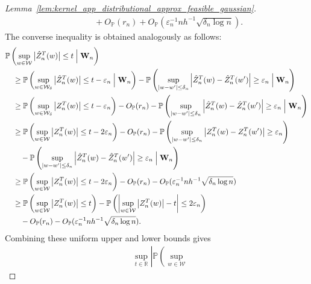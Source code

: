 \documentclass[11pt,lof]{puthesis}
\renewcommand{\P}{\ensuremath{\mathbb{P}}}
\newcommand{\R}{\ensuremath{\mathbb{R}}}
\newcommand{\bW}{\ensuremath{\mathbf{W}}}
\newcommand{\cW}{\ensuremath{\mathcal{W}}}
\theoremstyle{break}
\theoremstyle{proof}
\newtheorem{proof}{Proof}
\begin{document}
\begin{proof}[%
  Lemma~\ref{lem:kernel_app_distributional_approx_feasible_gaussian}]
\begin{align*}
    &\qquad+
    O_\P(r_n)
    + O_\P(\varepsilon_n^{-1} n h^{-1} \sqrt{\delta_n \log n}).
  \end{align*}
  The converse inequality is obtained
  analogously as follows:
  \begin{align*}
    &\P\left(
      \sup_{w \in \cW}
      \big| \hat Z_n^T(w) \big|
      \leq t
      \Bigm\vert \bW_n
    \right) \\
    &\quad\geq
    \P\left(
      \sup_{w \in \cW_\delta}
      \big| \hat Z_n^T(w) \big|
      \leq t - \varepsilon_n
      \Bigm\vert \bW_n
    \right)
    - \P\left(
      \sup_{|w-w'| \leq \delta_n}
      \left|
        \hat Z_n^T(w)
        - \hat Z_n^T(w')
      \right|
      \geq \varepsilon_n
      \Bigm\vert \bW_n
    \right) \\
    &\quad\geq
    \P\left(
      \sup_{w \in \cW_\delta}
      \big| Z_n^T(w) \big|
      \leq t - \varepsilon_n
    \right)
    - O_\P(r_n)
    - \P\left(
      \sup_{|w-w'| \leq \delta_n}
      \left|
        \hat Z_n^T(w)
        - \hat Z_n^T(w')
      \right|
      \geq \varepsilon_n
      \Bigm\vert \bW_n
    \right) \\
    &\quad\geq
    \P\left(
      \sup_{w \in \cW}
      \big| Z_n^T(w) \big|
      \leq t - 2\varepsilon_n
    \right)
    - O_\P(r_n)
    - \P\left(
      \sup_{|w-w'| \leq \delta_n}
      \left|
        Z_n^T(w)
        - Z_n^T(w')
      \right|
      \geq \varepsilon_n
    \right) \\
    &\qquad-
    \P\left(
      \sup_{|w-w'| \leq \delta_n}
      \left|
        \hat Z_n^T(w)
        - \hat Z_n^T(w')
      \right|
      \geq \varepsilon_n
      \Bigm\vert \bW_n
    \right) \\
    &\quad\geq
    \P\left(
      \sup_{w \in \cW}
      \big| Z_n^T(w) \big|
      \leq t - 2\varepsilon_n
    \right)
    - O_\P(r_n)
    - O_\P(\varepsilon_n^{-1} n h^{-1} \sqrt{\delta_n \log n}) \\
    &\quad\geq
    \P\left(
      \sup_{w \in \cW}
      \big| Z_n^T(w) \big|
      \leq t
    \right)
    - \P\left(
      \left|
        \sup_{w \in \cW}
        \big| Z_n^T(w) \big|
        - t
      \right|
      \leq 2\varepsilon_n
    \right) \\
    &\qquad-
    O_\P(r_n)
    - O_\P(\varepsilon_n^{-1} n h^{-1} \sqrt{\delta_n \log n}).
  \end{align*}
  Combining these uniform upper and lower bounds gives
  \begin{align*}
    &\sup_{t \in \R}
    \left|
      \P\left(
        \sup_{w \in \cW}

\end{align*}
\end{proof}
\end{document}
